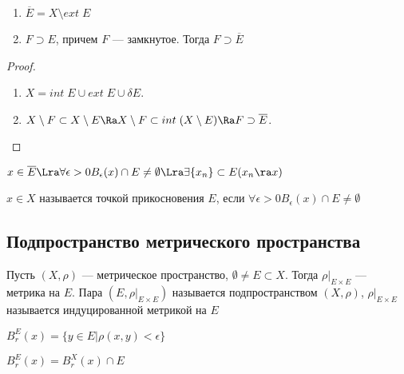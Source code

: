 \begin{note}\indent
    \begin{enumerate}
        \item \(\overline{E} = X \setminus ext\;E\)
        \item \(F \supset E\), причем \(F\) --- замкнутое. Тогда \(F \supset \overline{E}\)
    \end{enumerate}
\end{note}
\begin{proof}
    \indent
    \begin{enumerate}
        \item \(X = int\;E \cup ext\;E \cup \delta E\).
        \item \(X \setminus F \subset X \setminus E \Ra X \setminus F \subset int\;(X \setminus E) \Ra F \supset \overline{E}\).
    \end{enumerate}
\end{proof}

\begin{note}
    \(x \in \overline{E} \Lra \forall \epsilon > 0 B_\epsilon(x) \cap E \ne \emptyset \Lra \exists \{x_n\} \subset E(x_n \ra x)\)
\end{note}

\begin{definition}
    \(x \in X\) называется точкой прикосновения \(E\), если \(\forall \epsilon > 0 B_\epsilon(x) \cap E \ne \emptyset\)
\end{definition}

\subsection{Подпространство метрического пространства}
\begin{definition}
    Пусть \((X, \rho)\) --- метрическое пространство, \(\emptyset \ne E \subset X\). Тогда \(\rho|_{E\times E}\) --- метрика на \(E\). Пара \((E, \rho|_{E\times E})\) называется подпространством \((X, \rho)\), \(\rho|_{E\times E}\) называется индуцированной метрикой на \(E\)
\end{definition}

\begin{definition}
    \(B_r^E(x) = \{y \in E | \rho(x, y) < \epsilon\}\)
\end{definition}

\begin{note}
    \(B_r^E(x) = B_r^X(x)\cap E\)
\end{note}

